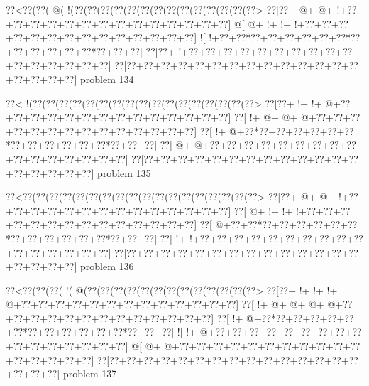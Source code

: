 \vbox{\vbox{\goo
\0??<\0??(\0??(\- @(\- !(\0??(\0??(\0??(\0??(\0??(\0??(\0??(\0??(\0??(\0??(\0??(\0??(\0??(\0??>
\0??[\0??+\- @+\- @+\- !+\0??+\0??+\0??+\0??+\0??+\0??+\0??+\0??+\0??+\0??+\0??+\0??+\0??+\0??]
\- @[\- @+\- !+\- !+\- !+\0??+\0??+\0??+\0??+\0??+\0??+\0??+\0??+\0??+\0??+\0??+\0??+\0??+\0??]
\- ![\- !+\0??+\0??*\0??+\0??+\0??+\0??+\0??+\0??*\0??+\0??+\0??+\0??+\0??+\0??*\0??+\0??+\0??]
\0??[\0??+\- !+\0??+\0??+\0??+\0??+\0??+\0??+\0??+\0??+\0??+\0??+\0??+\0??+\0??+\0??+\0??+\0??]
\0??[\0??+\0??+\0??+\0??+\0??+\0??+\0??+\0??+\0??+\0??+\0??+\0??+\0??+\0??+\0??+\0??+\0??+\0??]
}
\hfil problem 134\hfil\break
}



\vbox{\vbox{\goo
\0??<\- !(\0??(\0??(\0??(\0??(\0??(\0??(\0??(\0??(\0??(\0??(\0??(\0??(\0??(\0??(\0??(\0??(\0??>
\0??[\0??+\- !+\- !+\- @+\0??+\0??+\0??+\0??+\0??+\0??+\0??+\0??+\0??+\0??+\0??+\0??+\0??+\0??]
\0??[\- !+\- @+\- @+\- @+\0??+\0??+\0??+\0??+\0??+\0??+\0??+\0??+\0??+\0??+\0??+\0??+\0??+\0??]
\0??[\- !+\- @+\0??*\0??+\0??+\0??+\0??+\0??+\0??*\0??+\0??+\0??+\0??+\0??+\0??*\0??+\0??+\0??]
\0??[\- @+\- @+\0??+\0??+\0??+\0??+\0??+\0??+\0??+\0??+\0??+\0??+\0??+\0??+\0??+\0??+\0??+\0??]
\0??[\0??+\0??+\0??+\0??+\0??+\0??+\0??+\0??+\0??+\0??+\0??+\0??+\0??+\0??+\0??+\0??+\0??+\0??]
}
\hfil problem 135\hfil\break
}



\vbox{\vbox{\goo
\0??<\0??(\0??(\0??(\0??(\0??(\0??(\0??(\0??(\0??(\0??(\0??(\0??(\0??(\0??(\0??(\0??(\0??(\0??>
\0??[\0??+\- @+\- @+\- !+\0??+\0??+\0??+\0??+\0??+\0??+\0??+\0??+\0??+\0??+\0??+\0??+\0??+\0??]
\0??[\- @+\- !+\- !+\- !+\0??+\0??+\0??+\0??+\0??+\0??+\0??+\0??+\0??+\0??+\0??+\0??+\0??+\0??]
\0??[\- @+\0??+\0??*\0??+\0??+\0??+\0??+\0??+\0??*\0??+\0??+\0??+\0??+\0??+\0??*\0??+\0??+\0??]
\0??[\- !+\- !+\0??+\0??+\0??+\0??+\0??+\0??+\0??+\0??+\0??+\0??+\0??+\0??+\0??+\0??+\0??+\0??]
\0??[\0??+\0??+\0??+\0??+\0??+\0??+\0??+\0??+\0??+\0??+\0??+\0??+\0??+\0??+\0??+\0??+\0??+\0??]
}
\hfil problem 136\hfil\break
}



\vbox{\vbox{\goo
\0??<\0??(\0??(\0??(\- !(\- @(\0??(\0??(\0??(\0??(\0??(\0??(\0??(\0??(\0??(\0??(\0??(\0??(\0??>
\0??[\0??+\- !+\- !+\- !+\- @+\0??+\0??+\0??+\0??+\0??+\0??+\0??+\0??+\0??+\0??+\0??+\0??+\0??]
\0??[\- !+\- @+\- @+\- @+\- @+\0??+\0??+\0??+\0??+\0??+\0??+\0??+\0??+\0??+\0??+\0??+\0??+\0??]
\0??[\- !+\- @+\0??*\0??+\0??+\0??+\0??+\0??+\0??*\0??+\0??+\0??+\0??+\0??+\0??*\0??+\0??+\0??]
\- ![\- !+\- @+\0??+\0??+\0??+\0??+\0??+\0??+\0??+\0??+\0??+\0??+\0??+\0??+\0??+\0??+\0??+\0??]
\- @[\- @+\- @+\0??+\0??+\0??+\0??+\0??+\0??+\0??+\0??+\0??+\0??+\0??+\0??+\0??+\0??+\0??+\0??]
\0??[\0??+\0??+\0??+\0??+\0??+\0??+\0??+\0??+\0??+\0??+\0??+\0??+\0??+\0??+\0??+\0??+\0??+\0??]
}
\hfil problem 137\hfil\break
}



